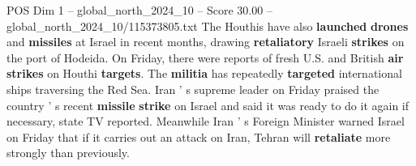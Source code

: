 \begin{textsample}{POS Dim 1 – global\_north\_2024\_10 – Score 30.00 – global\_north\_2024\_10/115373805.txt}
The Houthis have also \textbf{launched} \textbf{drones} and \textbf{missiles} at Israel in recent months, drawing \textbf{retaliatory} Israeli \textbf{strikes} on the port of Hodeida.
On Friday, there were reports of fresh U.S. and British \textbf{air} \textbf{strikes} on Houthi \textbf{targets}.
The \textbf{militia} has repeatedly \textbf{targeted} international ships traversing the Red Sea.
Iran ' s supreme leader on Friday praised the country ' s recent \textbf{missile} \textbf{strike} on Israel and said it was ready to do it again if necessary, state TV reported.
Meanwhile Iran ' s Foreign Minister warned Israel on Friday that if it carries out an attack on Iran, Tehran will \textbf{retaliate} more strongly than previously.

\end{textsample}
